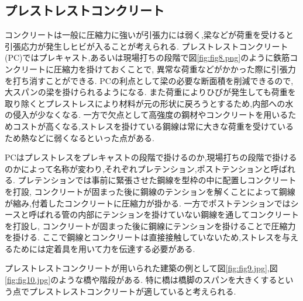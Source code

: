 \subsection*{プレストレストコンクリート}
コンクリートは一般に圧縮力に強いが引張力には弱く,梁などが荷重を受けると引張応力が発生しヒビが入ることが考えられる.
プレストレストコンクリート(PC)ではプレキャスト,あるいは現場打ちの段階で図\ref{fig:fig8.png}のように鉄筋コンクリートに圧縮力を掛けておくことで,
異常な荷重などがかかった際に引張力を打ち消すことができる.
PCの利点として梁の必要な断面積を削減できるので,大スパンの梁を掛けられるようになる.
また荷重によりひびが発生しても荷重を取り除くとプレストレスにより材料が元の形状に戻ろうとするため,内部への水の侵入が少なくなる.
一方で欠点として高強度の鋼材やコンクリートを用いるためコストが高くなる,ストレスを掛けている鋼線は常に大きな荷重を受けているため熱などに弱くなるといった点がある.

PCはプレストレスをプレキャストの段階で掛けるのか,現場打ちの段階で掛けるのかによって名称が変わり,それぞれプレテンション,ポストテンションと呼ばれる.
プレテンションでは事前に緊張させた鋼線を型枠の中に配置しコンクリートを打設,
コンクリートが固まった後に鋼線のテンションを解くことによって鋼線が縮み,付着したコンクリートに圧縮力が掛かる.
一方でポストテンションではシースと呼ばれる管の内部にテンションを掛けていない鋼線を通してコンクリートを打設し,
コンクリートが固まった後に鋼線にテンションを掛けることで圧縮力を掛ける.
ここで鋼線とコンクリートは直接接触していないため,ストレスを与えるためには定着具を用いて力を伝達する必要がある.

プレストレストコンクリートが用いられた建築の例として図\ref{fig:fig9.jpg},図\ref{fig:fig10.jpg}のような橋や階段がある.
特に橋は橋脚のスパンを大きくするという点でプレストレストコンクリートが適していると考えられる.
\begin{figure}[htbp]
  \begin{minipage}{0.5\hsize}
  \end{minipage}
  \begin{minipage}{0.5\hsize}
  \end{minipage}
\end{figure}